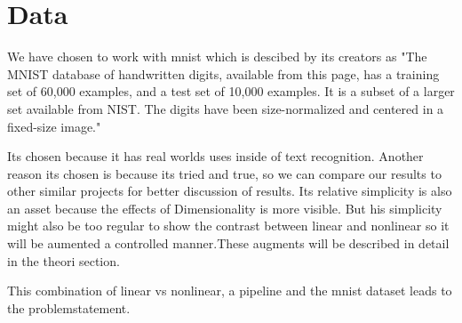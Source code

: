 \section*{Data}

We have chosen to work with mnist which is descibed by its creators as
"The MNIST database of handwritten digits, available from this page, has a training set of 60,000 examples, and a test set of 10,000 examples. It is a subset of a larger set available from NIST. The digits have been size-normalized and centered in a fixed-size image."

Its chosen because it has real worlds uses inside of text recognition. Another reason its chosen is because its tried and true, so we can compare our results to other similar projects for better discussion of results. Its relative simplicity is also an asset because the effects of Dimensionality is more visible. But his simplicity might also be too regular to show the contrast between linear and nonlinear so it will be aumented a controlled manner.These augments will be described in detail in the theori section.

This combination of linear vs nonlinear, a pipeline and the mnist dataset leads to the problemstatement.